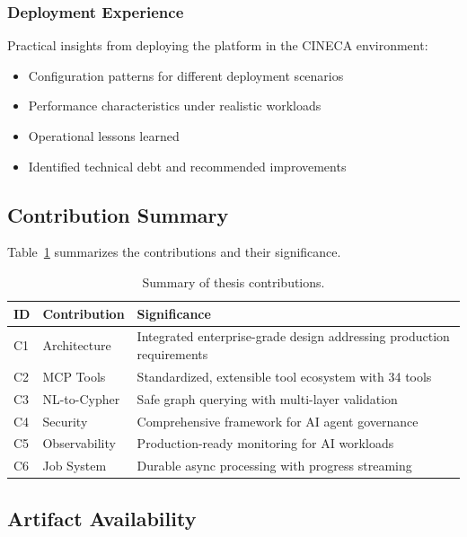 \documentclass[a4paper,twoside]{sapthesis}
\begin{document}
\subsubsection{Deployment Experience}

Practical insights from deploying the platform in the CINECA environment:
\begin{itemize}
    \item Configuration patterns for different deployment scenarios
    \item Performance characteristics under realistic workloads
    \item Operational lessons learned
    \item Identified technical debt and recommended improvements
\end{itemize}

\subsection{Contribution Summary}

Table~\ref{tab:contribution-summary} summarizes the contributions and their significance.

\begin{table}[ht]
\centering
\caption{Summary of thesis contributions.}
\label{tab:contribution-summary}
\small
\begin{tabular}{llp{6cm}}
\hline
\textbf{ID} & \textbf{Contribution} & \textbf{Significance} \\
\midrule
C1 & Architecture & Integrated enterprise-grade design addressing production requirements \\
C2 & MCP Tools & Standardized, extensible tool ecosystem with 34 tools \\
C3 & NL-to-Cypher & Safe graph querying with multi-layer validation \\
C4 & Security & Comprehensive framework for AI agent governance \\
C5 & Observability & Production-ready monitoring for AI workloads \\
C6 & Job System & Durable async processing with progress streaming \\
\midrule
\end{tabular}
\end{table}

\subsection{Artifact Availability}
\end{document}
